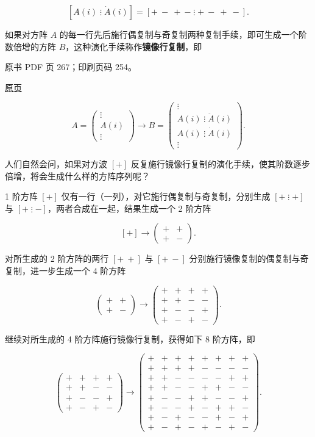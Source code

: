\[
[A(i)\mathrel{\vdots}\dot A(i)]=[+\ -\ +\ -\mathrel{\vdots}+\ -\ +\ -].
\]

如果对方阵 \(A\) 的每一行先后施行偶复制与奇复制两种复制手续，即可生成一个阶数倍增的方阵 \(B\)，这种演化手续称作\textbf{镜像行复制}，即

\clearpage

原书 PDF 页 267；印刷页码 254。

\href{source-images/pdf-267.jpeg}{原页}

\[
A=\begin{pmatrix}\vdots\\A(i)\\\vdots\end{pmatrix}
\longrightarrow B=\begin{pmatrix}
\vdots\\
A(i)\mathrel{\vdots}\ddot A(i)\\
A(i)\mathrel{\vdots}\dot A(i)\\
\vdots
\end{pmatrix}.
\]

人们自然会问，如果对方波 \([+]\) 反复施行镜像行复制的演化手续，使其阶数逐步倍增，将会生成什么样的方阵序列呢？

1 阶方阵 \([+]\) 仅有一行（一列），对它施行偶复制与奇复制，分别生成 \([+\mathrel{\vdots}+]\) 与 \([+\mathrel{\vdots}-]\)，两者合成在一起，结果生成一个 2 阶方阵

\[
[+]\longrightarrow\begin{pmatrix}+&+\\+&-\end{pmatrix}.
\]

对所生成的 2 阶方阵的两行 \([+\ +]\) 与 \([+\ -]\) 分别施行镜像复制的偶复制与奇复制，进一步生成一个 4 阶方阵

\[
\begin{pmatrix}+&+\\+&-\end{pmatrix}\longrightarrow
\begin{pmatrix}
+&+&+&+\\
+&+&-&-\\
+&-&-&+\\
+&-&+&-
\end{pmatrix}.
\]

继续对所生成的 4 阶方阵施行镜像行复制，获得如下 8 阶方阵，即

\[
\begin{pmatrix}
+&+&+&+\\
+&+&-&-\\
+&-&-&+\\
+&-&+&-
\end{pmatrix}\longrightarrow
\begin{pmatrix}
+&+&+&+&+&+&+&+\\
+&+&+&+&-&-&-&-\\
+&+&-&-&-&-&+&+\\
+&+&-&-&+&+&-&-\\
+&-&-&+&+&-&-&+\\
+&-&-&+&-&+&+&-\\
+&-&+&-&-&+&-&+\\
+&-&+&-&+&-&+&-
\end{pmatrix}.
\]

